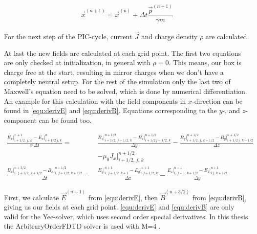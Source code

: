 \documentclass[bachelor_thesis]{subfiles}
\begin{document}
\begin{equation}
	\vec{x}^{(n+1)} = \vec{x}^{(n)} + \Delta t \frac{\vec{p}^{(n+1)}}{\gamma m}
	\label{equ:euler}
\end{equation}

For the next step of the PIC-cycle, current $\vec{J}$ and charge density $\rho$ are calculated. 

At last the new fields are calculated at each grid point. The first two equations are only checked at initialization, in general with $\rho=0$. This means, our box is charge free at the start, resulting in mirror charges when we don't have a completely neutral setup.
For the rest of the simulation only the last two of Maxwell's equation need to be solved, which is done by numerical differentiation. 
An example for this calculation with the field components in $x$-direction can be found in \autoref{equ:derivE} and \autoref{equ:derivB}. Equations corresponding to the $y$-, and $z$-component can be found too.

\begin{align}
	\frac{{E}_x\rvert_{i+1/2,\, j,\, k}^{n+1} - {E}_x\rvert_{i+1/2\, j,\, k}^{n}}{c^2\Delta t}
	=& \frac{{B}_z\rvert_{i+1/2,\, j+1/2,\, k}^{n+1/2} - {B}_z\rvert_{i+1/2\, j-1/2,\, k}^{n+1/2}}{\Delta y}
	- \frac{{B}_y\rvert_{i+1/2,\, j,\, k+1/2}^{n+1/2} - {B}_y\rvert_{i+1/2\, j,\, k-1/2}^{n+1/2}}{\Delta z}
	\label{equ:derivE}	\\&
	-\mu_0 J_x \rvert_{i+1/2,\, j,\, k}^{n+1/2}											\nonumber	\\
	 \frac{{B}_x\rvert_{i,\, j+1/2,\, k+1/2}^{n+3/2} - {B}_x\rvert_{i,\, j+1/2,\, k+1/2}^{n+1/2}}{\Delta t} 
	 =& \frac{{E}_y\rvert_{i,\, j+1/2,\, k+1}^{n+1} - {E}_y\rvert_{i\, j+1/2,\, k}^{n+1}}{\Delta z}
	- \frac{{E}_z\rvert_{i,\, j+1,\, k+1/2}^{n+1} - {E}_z\rvert_{i\, j,\, k+1/2}^{n+1}}{\Delta y}
	\label{equ:derivB}
\end{align}

First, we calculate $\vec{E}^{(n+1)}$ from \autoref{equ:derivE}, then $\vec{B}^{(n+3/2)}$ from \autoref{equ:derivB}, giving us our fields at each grid point. \autoref{equ:derivE} and \autoref{equ:derivB} are only valid for the Yee-solver, which uses second order special derivatives.
In this thesis the ArbitraryOrderFDTD solver is used with M=4 .
\end{document}
